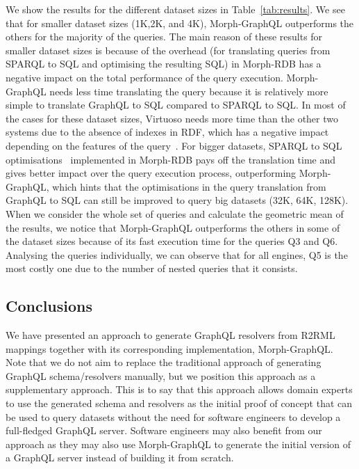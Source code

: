 We show the results for the different dataset sizes in Table~\ref{tab:results}. We see that for smaller dataset sizes (1K,2K, and 4K), Morph-GraphQL outperforms the others for the majority of the queries. The main reason of these results for smaller dataset sizes is because of the overhead (for translating queries from SPARQL to SQL and optimising the resulting SQL) in Morph-RDB has a negative impact on the total performance of the query execution. Morph-GraphQL needs less time translating the query because it is relatively more simple to translate GraphQL to SQL compared to SPARQL to SQL. In most of the cases for these dataset sizes, Virtuoso needs more time than the other two systems due to the absence of indexes in RDF, which has a negative impact depending on the features of the query~\citep{endris2019ontario}. For bigger datasets, SPARQL to SQL optimisations~\citep{priyatna2014formalisation} implemented in Morph-RDB pays off the translation time and gives better impact over the query execution process, outperforming Morph-GraphQL, which hints that the optimisations in the query translation from GraphQL to SQL can still be improved to query big datasets (32K, 64K, 128K). When we consider the whole set of queries and calculate the geometric mean of the results, we notice that Morph-GraphQL outperforms the others in some of the dataset sizes because of its fast execution time for the queries Q3 and Q6. Analysing the queries individually, we can observe that for all engines, Q5 is the most costly one due to the number of nested queries that it consists. 


\subsection{Conclusions}
We have presented an approach to generate GraphQL resolvers from R2RML mappings together with its corresponding implementation, Morph-GraphQL. Note that we do not aim to replace the traditional approach of generating GraphQL schema/resolvers manually, but we position this approach as a supplementary approach. This is to say that this approach allows domain experts to use the generated schema and resolvers as the initial proof of concept that can be used to query datasets without the need for software engineers to develop a full-fledged GraphQL server. Software engineers may also benefit from our approach as they may also use Morph-GraphQL to generate the initial version of a GraphQL server instead of building it from scratch. 


